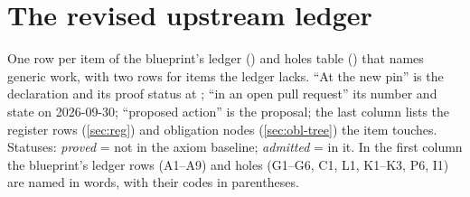 \section{The revised upstream ledger}\label{sec:ark-ledger}

One row per item of the blueprint's ledger () and holes table
() that names generic work, with two rows for items the ledger lacks.
``At the new pin'' is the declaration and its proof status at ; ``in an open pull
request'' its number and state on 2026-09-30; ``proposed action'' is the proposal; the last
column lists the register rows (\cref{sec:reg}) and obligation nodes (\cref{sec:obl-tree}) the
item touches. Statuses: \emph{proved} = not in the axiom baseline; \emph{admitted} = in it. In
the first column the blueprint's ledger rows (A1--A9) and holes (G1--G6, C1, L1, K1--K3, P6, I1)
are named in words, with their codes in parentheses.

